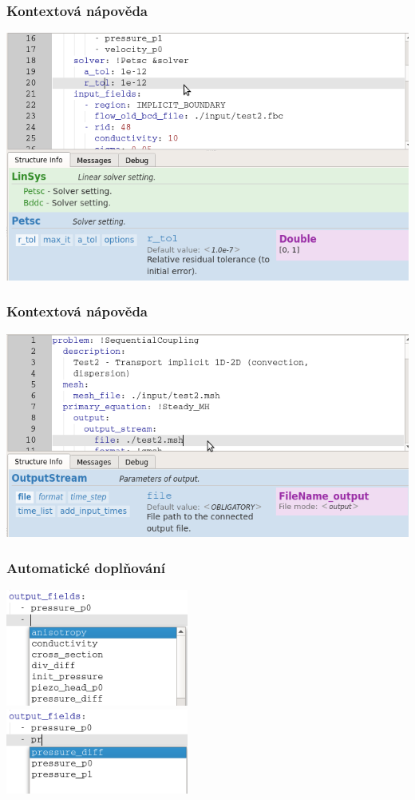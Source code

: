 \begin{frame}
	\frametitle{Kontextová nápověda}
	\includegraphics[width=\textwidth]{img/doc_solver.png}
\end{frame}

\begin{frame}
	\frametitle{Kontextová nápověda}
	\vspace{10pt}
	\includegraphics[width=\textwidth]{img/doc_file.png}
\end{frame}

\begin{frame}
	\frametitle{Automatické doplňování}
	\hspace{65pt}
	\vspace{0pt}
	\includegraphics[width=0.45\textwidth]{img/autocompletion_all.png}\\
	\vspace*{15pt}
	\hspace{65pt}
	\includegraphics[width=0.45\textwidth]{img/autocompletion_filtered.png}\\
\end{frame}


